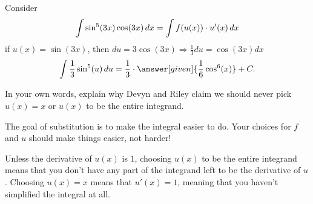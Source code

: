 \documentclass{ximera}
\begin{document}
\begin{problem}
  Consider
  \[
  \int \sin^5(3x) \cos(3x) \mathop{}\!d x = \int f(u(x)) \cdot u'(x) \mathop{}\!d x
  \]
  if $u(x) = \sin(3x)$, then $du=3\cos(3x)\Rightarrow \frac{1}{3}du=\cos(3x)dx$
  \[
  \int \frac{1}{3}\sin^5(u) \d u=\frac{1}{3}\cdot\answer[given]{\frac{1}{6}\cos^6(x)}+C.
  \]


\end{problem}

\begin{problem}
	In your own words, explain why Devyn and Riley claim we should never 
	pick $u(x) = x$ or $u(x)$ to be the entire integrand.
	\begin{freeResponse}
		The goal of substitution is to make the integral easier to do.  Your choices
		for $f$ and $u$ should make things easier, not harder!
	
		Unless the derivative of $u(x)$ is $1$, choosing $u(x)$ to be the entire
		integrand means that you don't have any part of the integrand left to be
		the derivative of $u$.  Choosing $u(x) = x$ means that $u'(x) = 1$, meaning
		that you haven't simplified the integral at all.  
	\end{freeResponse}
\end{problem}


\end{document}
